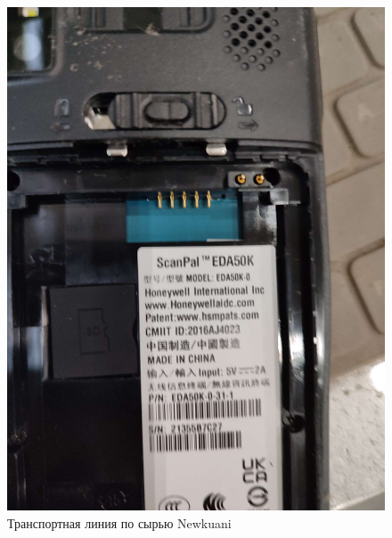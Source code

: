 \begin{figure}
\begin{center}
  \includegraphics[height=0.4\textheight, width=\textwidth, keepaspectratio]{Pics/d_Newkuani_3.JPEG}
\end{center}
  \caption{Транспортная линия по сырью Newkuani}
  \label{pic:d_Newkuani_3}
\end{figure}

